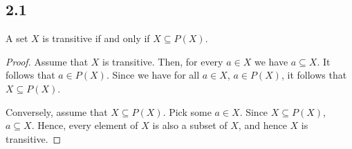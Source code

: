 \subsection*{2.1} A set $X$ is transitive if and only if $X \subseteq P(X)$.

\begin{proof}
    Assume that $X$ is transitive. Then, for every $a \in X$ we have $a \subseteq X$. It follows that $a \in P(X)$. Since we have for all $a \in X$, $a \in P(X)$, it follows that $X \subseteq P(X)$.

    Conversely, assume that $X \subseteq P(X)$. Pick some $a \in X$. Since $X \subseteq P(X)$, $a \subseteq X$. Hence, every element of $X$ is also a subset of $X$, and hence $X$ is transitive.
\end{proof}


